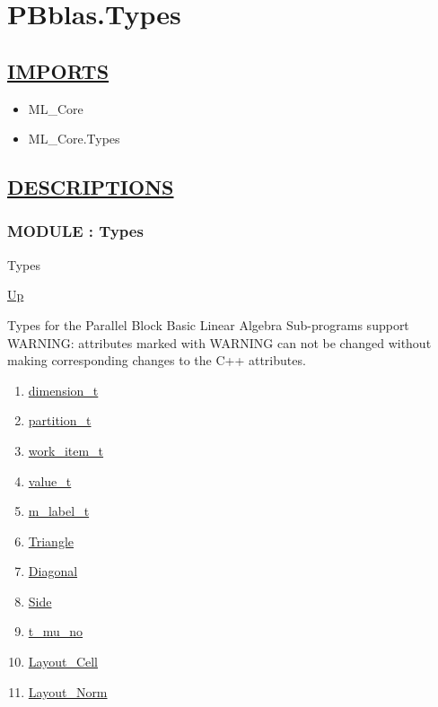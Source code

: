 \chapter*{PBblas.Types}
\hypertarget{ecldoc:toc:PBblas.Types}{}

\section*{\underline{IMPORTS}}
\begin{itemize}
\item ML\_Core
\item ML\_Core.Types
\end{itemize}

\section*{\underline{DESCRIPTIONS}}
\subsection*{MODULE : Types}
\hypertarget{ecldoc:PBblas.Types}{}
\begin{minipage}[t]{\textwidth}
\begin{flushleft}
 Types 
\end{flushleft}
\end{minipage}
\hyperlink{ecldoc:toc:PBblas}{Up}

\par
Types for the Parallel Block Basic Linear Algebra Sub-programs support WARNING: attributes marked with WARNING can not be changed without making corresponding changes to the C++ attributes.
\par
\begin{enumerate}
\item \hyperlink{ecldoc:pbblas.types.dimension_t}{dimension\_t}
\item \hyperlink{ecldoc:pbblas.types.partition_t}{partition\_t}
\item \hyperlink{ecldoc:pbblas.types.work_item_t}{work\_item\_t}
\item \hyperlink{ecldoc:pbblas.types.value_t}{value\_t}
\item \hyperlink{ecldoc:pbblas.types.m_label_t}{m\_label\_t}
\item \hyperlink{ecldoc:ecldoc-Triangle}{Triangle}
\item \hyperlink{ecldoc:ecldoc-Diagonal}{Diagonal}
\item \hyperlink{ecldoc:ecldoc-Side}{Side}
\item \hyperlink{ecldoc:pbblas.types.t_mu_no}{t\_mu\_no}
\item \hyperlink{ecldoc:pbblas.types.layout_cell}{Layout\_Cell}
\item \hyperlink{ecldoc:pbblas.types.layout_norm}{Layout\_Norm}
\end{enumerate}
